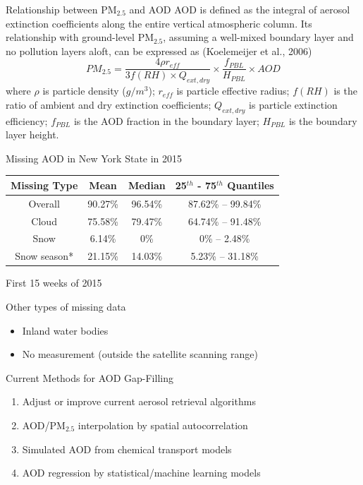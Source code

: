 \documentclass{beamer}
\begin{document}
\begin{frame}{Relationship between PM$_{2.5}$ and AOD}
    AOD is defined as the integral of aerosol extinction coefficients along the entire vertical atmospheric column. Its relationship with ground-level PM$_{2.5}$, assuming a well-mixed boundary layer and no pollution layers aloft, can be expressed as (Koelemeijer et al., 2006)
    \begin{equation*}
        PM_{2.5}=\frac{4\rho r_{eff}}{3f(RH)\times Q_{ext,dry}}\times\frac{f_{PBL}}{H_{PBL}}\times AOD
    \end{equation*}
    where $\rho$ is particle density ($g/m^3$); $r_{eff}$ is particle effective radius; $f(RH)$ is the ratio of ambient and dry extinction coefficients; $Q_{ext,dry}$ is particle extinction efficiency; $f_{PBL}$ is the AOD fraction in the boundary layer; $H_{PBL}$ is the boundary layer height.
\end{frame}

\begin{frame}{Missing AOD in New York State in 2015}
    \label{frm:missing}
    \begin{table}
        \centering
        \begin{tabular}{c|c|c|c}
            \hline
            Missing Type & Mean & Median & 25$^{th}$ - 75$^{th}$ Quantiles \\
            \hline
            Overall & 90.27\% & 96.54\% & 87.62\% -- 99.84\% \\
            Cloud & 75.58\% & 79.47\% & 64.74\% -- 91.48\% \\
            Snow & 6.14\% & 0\% & 0\% -- 2.48\% \\
            Snow season* & 21.15\% & 14.03\% & 5.23\% -- 31.18\% \\
            \hline
        \end{tabular}
    \end{table}
    {\footnotesize * First 15 weeks of 2015}
    \begin{block}{Other types of missing data}
        \begin{itemize}
            \item Inland water bodies
            \item No measurement (outside the satellite scanning range)
        \end{itemize}
    \end{block}
\end{frame}

\begin{frame}{Current Methods for AOD Gap-Filling}
    \begin{enumerate}
        \item Adjust or improve current aerosol retrieval algorithms
        \item AOD/PM$_{2.5}$ interpolation by spatial autocorrelation
        \item Simulated AOD from chemical transport models
        \item AOD regression by statistical/machine learning models
    \end{enumerate}
\end{frame}
\end{document}
